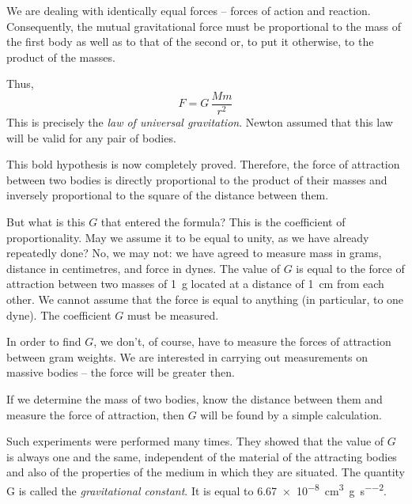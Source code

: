 We are dealing with identically equal forces -- forces of
action and reaction. Consequently, the mutual gravitational force must be proportional to the mass of the first
body as well as to that of the second or, to put it otherwise, to the product of the masses.

Thus,
 \begin{equation*}%
F =  G  \, \dfrac{Mm}{r^{2}}
 \end{equation*}
 This is precisely the \emph{law of universal gravitation}. Newton
assumed that this law will be valid for any pair of bodies.

This bold hypothesis is now completely proved. Therefore, the force of attraction between two bodies is directly proportional to the product of their masses and inversely proportional to the square of the distance between them.

But what is this $G$ that entered the formula? This is the coefficient of proportionality. May we assume it to be equal to unity, as we have already repeatedly done? No, we may not: we have agreed to measure mass in grams, distance in centimetres, and force in dynes. The value of $G$ is equal to the force of attraction between two masses of \SI{1}{\gram} located at a distance of \SI{1}{\centi\meter} from each other. We cannot assume that the force is equal to anything (in particular, to one dyne). The coefficient $G$ must be measured.

In order to find $G$, we don't, of course, have to measure the forces of attraction between gram weights. We are interested in carrying out measurements on massive bodies -- the force will be greater then.

If we determine the mass of two bodies, know the distance between them and measure the force of attraction,
then $G$ will be found by a simple calculation.

Such experiments were performed many times. They showed that the value of $G$ is always one and the same, independent of the material of the attracting bodies and also of the properties of the medium in which they are situated. The quantity G is called the \emph{gravitational constant}. It is equal to \SI{6.67e-8}{\centi\meter\cubed\per\gram\per\second\squared}.

